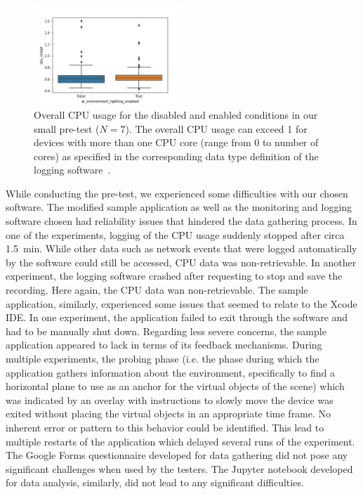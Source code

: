 \documentclass[12pt,twoside,english]{article}
\begin{document}
\begin{figure}[h]
    \centering
    \includegraphics[width=0.5\textwidth]{imgs/cpu_raw_plot}
    \caption{Overall \gls{CPU} usage for the disabled and enabled conditions in our small pre-test ($ N = 7 $). The overall \gls{CPU} usage can exceed 1 for devices with more than one \gls{CPU} core (range from 0 to number of cores) as specified in the corresponding data type definition of the logging software~\cite{apple_system_2020}.}
    \label{fig:cpu_raw_plot}
\end{figure}

While conducting the pre-test, we experienced some difficulties with our chosen software.
The modified sample application as well as the monitoring and logging software chosen had reliability issues that hindered the data gathering process.
In one of the experiments, logging of the \gls{CPU} usage suddenly stopped after circa 1.5~min.
While other data such as network events that were logged automatically by the software could still be accessed, \gls{CPU} data was non-retrievable.
In another experiment, the logging software crashed after requesting to stop and save the recording.
Here again, the \gls{CPU} data wan non-retrievable.
The sample application, similarly, experienced some issues that seemed to relate to the Xcode \gls{IDE}.
In one experiment, the application failed to exit through the software and had to be manually shut down.
Regarding less severe concerns, the sample application appeared to lack in terms of its feedback mechanisms.
During multiple experiments, the probing phase (i.e. the phase during which the application gathers information about the environment, specifically to find a horizontal plane to use as an anchor for the virtual objects of the scene) which was indicated by an overlay with instructions to slowly move the device was exited without placing the virtual objects in an appropriate time frame.
No inherent error or pattern to this behavior could be identified.
This lead to multiple restarts of the application which delayed several runs of the experiment.
The Google Forms questionnaire developed for data gathering did not pose any significant challenges when used by the testers.
The Jupyter notebook developed for data analysis, similarly, did not lead to any significant difficulties.
\end{document}
